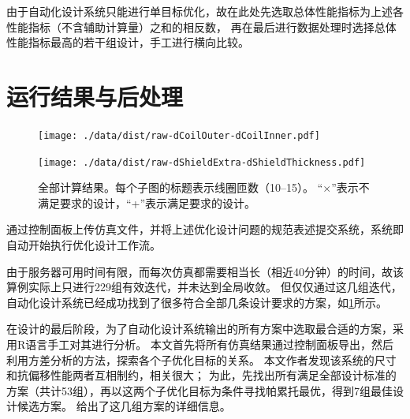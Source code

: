 \documentclass[index]{subfiles}
\begin{document}
由于自动化设计系统只能进行单目标优化，故在此处先选取总体性能指标为上述各性能指标（不含辅助计算量）之和的相反数，
再在最后进行数据处理时选择总体性能指标最高的若干组设计，手工进行横向比较。

\section{运行结果与后处理}
\begin{figure}[p]
  \centering%
    {\texttt{[image: ./data/dist/raw-dCoilOuter-dCoilInner.pdf]}}\par
    {\texttt{[image: ./data/dist/raw-dShieldExtra-dShieldThickness.pdf]}}
  \caption[全部计算结果]{全部计算结果。每个子图的标题表示线圈匝数（\numrange{10}{15}）。
  “$\times$”表示不满足要求的设计，“+”表示满足要求的设计。\label{fig:example-res}}
\end{figure}
通过控制面板上传仿真文件，并将上述优化设计问题的规范表述提交系统，系统即自动开始执行优化设计工作流。

由于服务器可用时间有限，而每次仿真都需要相当长（相近40分钟）的时间，故该算例实际上只进行229组有效迭代，并未达到全局收敛。
但仅仅通过这几组迭代，自动化设计系统已经成功找到了很多符合全部几条设计要求的方案，如\cref{fig:example-res}所示。

在设计的最后阶段，为了自动化设计系统输出的所有方案中选取最合适的方案，采用R语言手工对其进行分析。
本文首先将所有仿真结果通过控制面板导出，然后利用方差分析的方法，探索各个子优化目标的关系。
本文作者发现该系统的尺寸和抗偏移性能两者互相制约，相关很大；
为此，先找出所有满足全部设计标准的方案（共计53组），再以这两个子优化目标为条件寻找帕累托最优，得到7组最佳设计候选方案。
给出了这几组方案的详细信息。
\begin{table}[htbp]
  \centering
  \caption[最佳设计方案候选]{最佳设计方案候选。
  其中长度单位\si{\milli\metre}，电感单位\si{\micro\henry}，电阻单位\si{\milli\ohm}。\label{tbl:example-opt}}
  
\end{table}
\end{document}
